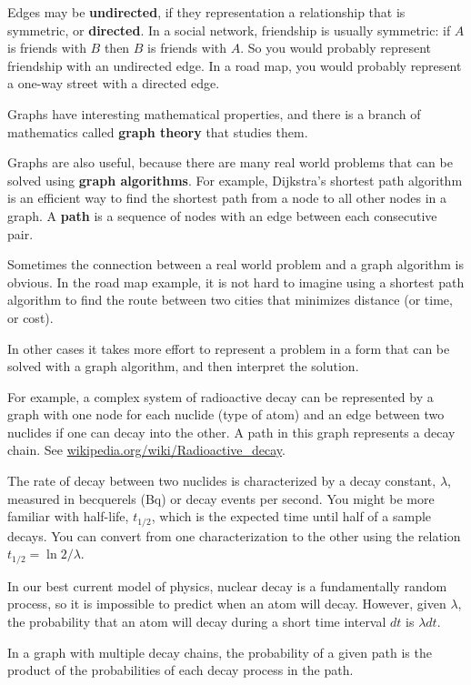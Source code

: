 \documentclass[10pt]{book}
\begin{document}
Edges may be {\bf undirected}, if they representation a relationship
that is symmetric, or {\bf directed}.  In a social network,
friendship is usually symmetric: if $A$ is friends with $B$ then
$B$ is friends with $A$.  So you would probably represent friendship
with an undirected edge.  In a road map, you would probably represent
a one-way street with a directed edge.

Graphs have interesting mathematical properties, and
there is a branch of mathematics called {\bf graph theory}
that studies them.

Graphs are also useful, because there are many real world
problems that can be solved using {\bf graph algorithms}.
For example, Dijkstra's shortest path algorithm is an efficient
way to find the shortest path from a node to all
other nodes in a graph.  A {\bf path} is a sequence of nodes
with an edge between each consecutive pair.

Sometimes the connection between a real world problem and
a graph algorithm is obvious.  In the road map example, it is
not hard to imagine using a shortest path algorithm to find
the route between two cities that minimizes distance (or time,
or cost).

In other cases it takes more effort to represent a problem in a form
that can be solved with a graph algorithm, and then interpret the
solution.

For example, a complex system of radioactive decay
can be represented by a
graph with one node for each nuclide (type of atom) and an edge
between two nuclides if one can decay into the other.  A path in this
graph represents a decay chain.
See \url{wikipedia.org/wiki/Radioactive_decay}.

The rate of decay between two nuclides is characterized by a decay
constant, $\lambda$, measured in becquerels (Bq) or decay events per
second.  You might be more familiar with half-life, $t_{1/2}$, which
is the expected time until half of a sample decays.  You can convert
from one characterization to the other using the relation $t_{1/2} =
\ln 2 / \lambda$.

In our best current model of physics, nuclear decay is a fundamentally
random process, so it is impossible to predict when an atom will
decay.  However, given $\lambda$, the probability that an atom will
decay during a short time interval $dt$ is $\lambda dt$.

In a graph with multiple decay chains, the probability of a
given path is the product of the probabilities of each decay
process in the path.
\end{document}
